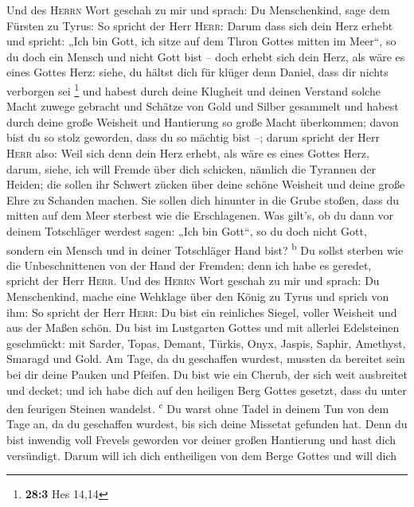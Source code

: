  Und des \textsc{Herrn} Wort geschah zu mir und sprach:
 Du Menschenkind, sage dem Fürsten zu Tyrus: So spricht
der Herr \textsc{Herr}: Darum dass sich dein Herz erhebt und spricht:
„Ich bin Gott, ich sitze auf dem Thron Gottes mitten im Meer``, so du
doch ein Mensch und nicht Gott bist -- doch erhebt sich dein Herz, als
wäre es eines Gottes Herz:  siehe, du hältst dich für
klüger denn Daniel, dass dir nichts verborgen sei \footnote{\textbf{28:3}
  Hes 14,14}  und habest durch deine Klugheit und deinen
Verstand solche Macht zuwege gebracht und Schätze von Gold und Silber
gesammelt  und habest durch deine große Weisheit und
Hantierung so große Macht überkommen; davon bist du so stolz geworden,
dass du so mächtig bist --;  darum spricht der Herr
\textsc{Herr} also: Weil sich denn dein Herz erhebt, als wäre es eines
Gottes Herz,  darum, siehe, ich will Fremde über dich
schicken, nämlich die Tyrannen der Heiden; die sollen ihr Schwert zücken
über deine schöne Weisheit und deine große Ehre zu Schanden machen.
 Sie sollen dich hinunter in die Grube stoßen, dass du
mitten auf dem Meer sterbest wie die Erschlagenen.  Was
gilt's, ob du dann vor deinem Totschläger werdest sagen: „Ich bin
Gott``, so du doch nicht Gott, sondern ein Mensch und in deiner
Totschläger Hand bist? \textsuperscript{b}  Du sollst
sterben wie die Unbeschnittenen von der Hand der Fremden; denn ich habe
es geredet, spricht der Herr \textsc{Herr}.  Und des
\textsc{Herrn} Wort geschah zu mir und sprach:  Du
Menschenkind, mache eine Wehklage über den König zu Tyrus und sprich von
ihm: So spricht der Herr \textsc{Herr}: Du bist ein reinliches Siegel,
voller Weisheit und aus der Maßen schön.  Du bist im
Lustgarten Gottes und mit allerlei Edelsteinen geschmückt: mit Sarder,
Topas, Demant, Türkis, Onyx, Jaspis, Saphir, Amethyst, Smaragd und Gold.
Am Tage, da du geschaffen wurdest, mussten da bereitet sein bei dir
deine Pauken und Pfeifen.  Du bist wie ein Cherub, der
sich weit ausbreitet und decket; und ich habe dich auf den heiligen Berg
Gottes gesetzt, dass du unter den feurigen Steinen wandelst.
\textsuperscript{c}  Du warst ohne Tadel in deinem Tun
von dem Tage an, da du geschaffen wurdest, bis sich deine Missetat
gefunden hat.  Denn du bist inwendig voll Frevels
geworden vor deiner großen Hantierung und hast dich versündigt. Darum
will ich dich entheiligen von dem Berge Gottes und will dich

